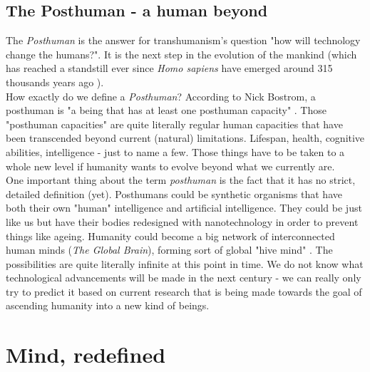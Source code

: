 \documentclass[12pt]{article}
\begin{document}
\subsection{The Posthuman - a human beyond}
	The \emph{Posthuman} is the answer for transhumanism's question "how will technology change the humans?". It is the next step in the evolution of the mankind (which has reached a standstill ever since \emph{Homo sapiens} have emerged around 315 thousands years ago \cite{homosapiens:1}). 
	\\How exactly do we define a \emph{Posthuman}? According to Nick Bostrom, a posthuman is "a being that has at least one posthuman capacity" \cite{posthuman:1}. Those "posthuman capacities" are quite literally regular human capacities that have been transcended beyond current (natural) limitations. Lifespan, health, cognitive abilities, intelligence - just to name a few. Those things have to be taken to a whole new level if humanity wants to evolve beyond what we currently are. 
	\\One important thing about the term \emph{posthuman} is the fact that it has no strict, detailed definition (yet). Posthumans could be synthetic organisms that have both their own "human" intelligence and artificial intelligence. They could be just like us but have their bodies redesigned with nanotechnology in order to prevent things like ageing. Humanity could become a big network of interconnected human minds (\emph{The Global Brain}), forming sort of global "hive mind" \cite{transhumanistFAQ:2}. The possibilities are quite literally infinite at this point in time. We do not know what technological advancements will be made in the next century - we can really only try to predict it based on current research that is being made towards the goal of ascending humanity into a new kind of beings.
\section{Mind, redefined}
\end{document}
